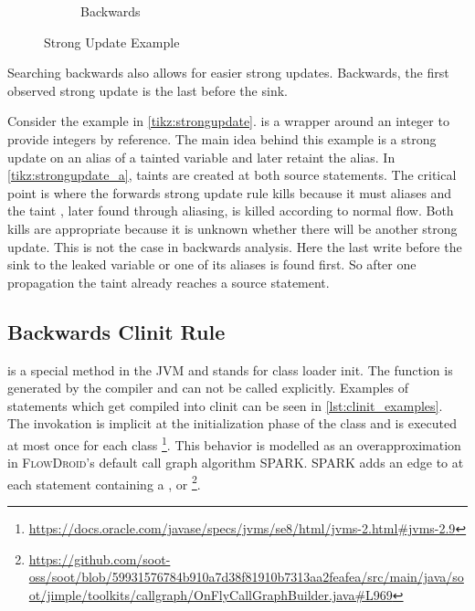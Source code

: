 \documentclass[../draft.tex]{subfiles}
\begin{document}
\begin{figure}[ht]
\begin{subfigure}[b]{0.45\textwidth}
            \caption{Backwards}
            \label{tikz:strongupdate_b}  
        \end{subfigure}
        \caption{Strong Update Example}
        \label{tikz:strongupdate}
    \end{figure}

    Searching backwards also allows for easier strong updates. Backwards, the first observed strong update is the last before the sink. 
    
    Consider the example in \autoref{tikz:strongupdate}.  is a wrapper around an integer to provide integers by reference. The main idea behind this example is a strong update on an alias of a tainted variable and later retaint the alias. In \ref{tikz:strongupdate_a}, taints are created at both source statements. The critical point is  where the forwards strong update rule kills  because it must aliases  and the taint , later found through aliasing, is killed according to normal flow. Both kills are appropriate because it is unknown whether there will be another strong update. This is not the case in backwards analysis. Here the last write before the sink to the leaked variable or one of its aliases is found first. So after one propagation the taint already reaches a source statement.

    \subsection{Backwards Clinit Rule}\label{s:clinitrule}
     is a special method in the JVM and stands for class loader init. The function is generated by the compiler and can not be called explicitly. Examples of statements which get compiled into clinit can be seen in \autoref{lst:clinit_examples}. The invokation is implicit at the initialization phase of the class and is executed at most once for each class \footnote{\url{https://docs.oracle.com/javase/specs/jvms/se8/html/jvms-2.html\#jvms-2.9}}. 
    This behavior is modelled as an overapproximation in \textsc{FlowDroid}'s default call graph algorithm SPARK. SPARK adds an edge to  at each statement containing a ,  or  \footnote{\url{https://github.com/soot-oss/soot/blob/59931576784b910a7d38f81910b7313aa2feafea/src/main/java/soot/jimple/toolkits/callgraph/OnFlyCallGraphBuilder.java\#L969}}.
   
\end{document}
